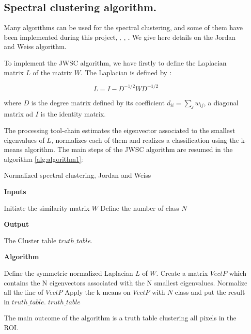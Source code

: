 \subsection{Spectral clustering algorithm.}

Many algorithms can be used for the spectral clustering, and some of them have been implemented during this project, \cite{von2007tutorial}, \cite{ng2002spectral},  \cite{shi2000normalized}. We give here details on the Jordan and Weiss algorithm.

To implement the JWSC algorithm, we have firstly to define the Laplacian matrix $L$ of the matrix $W$. The Laplacian is defined by :

\begin{equation}
L = I-D^{-1/2}WD^{-1/2}
\end{equation}

where $D$ is the degree matrix defined by its coefficient $d_{ii} = \sum_j w_{ij}$, a diagonal matrix ad $I$ is the identity matrix.

The processing tool-chain estimates the eigenvector associated to the smallest eigenvalues of $L$, normalizes each of them and realizes a classification using the k-means algorithm. The main steps of the JWSC algorithm are resumed in the algorithm \ref{alg:algorithm1}:

\begin{algorithm}
  \caption{Normalized spectral clustering, Jordan and Weiss }
  
  \textbf{Inputs}%
  \begin{algorithmic}[1]
    \STATE Initiate the similarity matrix $W$
    \STATE Define the number of class $N$
  \end{algorithmic}
  \bigskip

  \textbf{Output}%
  \begin{algorithmic}[1]
    \STATE The Cluster table $truth\_table$.
  \end{algorithmic}
  \bigskip
  
  \textbf{Algorithm}
  \begin{algorithmic}[1]
		\STATE Define the symmetric normalized Laplacian $L$ of $W$.
     	\STATE Create a matrix $VectP$ which contains the N eigenvectors associated with the N smallest eigenvalues.
     	\STATE Normalize all the line of $VectP$
     	\STATE Apply the k-means on $VectP$ with $N$ class and put the result in $truth\_table$.	
  \RETURN $truth\_table$
  \end{algorithmic}
  \label{alg:algorithm1}
\end{algorithm}

The main outcome of the algorithm is a truth table clustering all pixels in the ROI.
